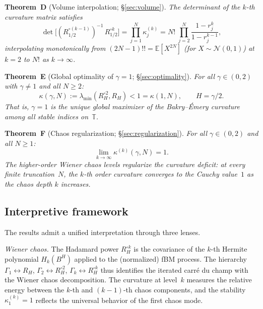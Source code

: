 \documentclass[11pt,a4paper]{article}
\theoremstyle{plain}
\theoremstyle{definition}
\theoremstyle{remark}
\newcommand{\E}{\mathbb{E}}
\newcommand{\T}{\mathbb{T}}
\begin{document}
\medskip\noindent
\textbf{Theorem~D} (Volume interpolation; \S\ref{sec:volume}).
\emph{The determinant of the $k$-th curvature matrix satisfies
\begin{equation}\label{eq:intro-D}
  \det\bigl[(R_{1/2}^{\circ(k-1)})^{-1}\,R_{1/2}^{\circ k}\bigr]
  = \prod_{j=1}^N \kappa_j^{(k)}
  = N!\;\prod_{j=2}^N \frac{1 - r_j^k}{1 - r_j^{k-1}},
\end{equation}
interpolating monotonically from $(2N{-}1)!! = \E[X^{2N}]$
(for $X \sim \mathcal{N}(0,1)$) at $k = 2$
to $N!$ as $k \to \infty$.}

\medskip\noindent
\textbf{Theorem~E} (Global optimality of $\gamma = 1$; \S\ref{sec:optimality}).
\emph{For all $\gamma \in (0,2)$ with $\gamma \neq 1$
and all $N \geq 2$:
\begin{equation}\label{eq:intro-E}
  \kappa(\gamma,N)
  := \lambda_{\min}(R_H^{\circ 2}, R_H)
  < 1
  = \kappa(1,N),
  \qquad H = \gamma/2.
\end{equation}
That is, $\gamma = 1$ is the unique global maximizer of the
Bakry--\'Emery curvature among all stable indices on~$\T$.}

\medskip\noindent
\textbf{Theorem~F} (Chaos regularization; \S\ref{sec:regularization}).
\emph{For all $\gamma \in (0,2)$ and all $N \geq 1$:
\begin{equation}\label{eq:intro-F}
  \lim_{k \to \infty} \kappa^{(k)}(\gamma, N) = 1.
\end{equation}
The higher-order Wiener chaos levels regularize the curvature
deficit: at every finite truncation~$N$, the $k$-th order curvature
converges to the Cauchy value~$1$ as the chaos depth $k$ increases.}


\subsection{Interpretive framework}

The results admit a unified interpretation through
three lenses.

\emph{Wiener chaos.}
The Hadamard power $R_H^{\circ k}$ is the covariance of the
$k$-th Hermite polynomial $H_k(B^H)$ applied to the (normalized)
fBM process. The hierarchy
$\Gamma_1 \leftrightarrow R_H$,
$\Gamma_2 \leftrightarrow R_H^{\circ 2}$,
$\Gamma_k \leftrightarrow R_H^{\circ k}$
thus identifies the iterated carr\'e du champ with the
Wiener chaos decomposition.
The curvature at level~$k$ measures the relative energy
between the $k$-th and $(k{-}1)$-th chaos components,
and the stability $\kappa_1^{(k)} = 1$ reflects the universal
behavior of the first chaos mode.
\end{document}

